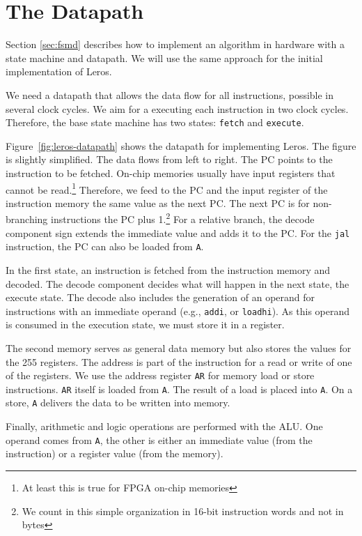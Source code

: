 \documentclass[%
    10pt,
    headinclude, footexclude,
    openright, %
    notitlepage,
    cleardoubleempty,
    headsepline,
    pointlessnumbers,
    bibtotoc, idxtotoc,
    ]{scrbook}
\newcommand{\code}[1]{{\lstinline[basicstyle=\small\ttfamily]{#1}}}
\begin{document}
\section{The Datapath}

Section \ref{sec:fsmd} describes how to implement an algorithm in hardware with
a state machine and datapath. We will use the same approach for the initial
implementation of Leros.

We need a datapath that allows the data flow for all instructions, possible in several
clock cycles. We aim for a executing each instruction in two clock cycles.
Therefore, the base state machine has two states: \code{fetch} and \code{execute}.

Figure~\ref{fig:leros-datapath} shows the datapath for implementing Leros.
The figure is slightly simplified.
The data flows from left to right. The PC points to the instruction to be fetched.
On-chip memories usually have input registers that cannot be read.\footnote{At least
this is true for FPGA on-chip memories} Therefore, we feed to the PC and the input register
of the instruction memory the same value as the next PC. The next PC is for non-branching
instructions the PC plus 1.\footnote{We count in this simple organization in 16-bit instruction
words and not in bytes} For a relative branch, the decode component sign extends the immediate
value and adds it to the PC. For the \code{jal} instruction, the PC can also be loaded from \code{A}.

In the first state, an instruction is fetched from the instruction memory and decoded.
The decode component decides what will happen in the next state, the execute state.
The decode also includes the generation of an operand for instructions with an immediate operand
(e.g., \code{addi}, or \code{loadhi}). As this operand is consumed in the execution state,
we must store it in a register.

The second memory serves as general data memory but also stores the values for the
255 registers. The address is part of the instruction for a read or write of one of the registers.
We use the address register \code{AR} for memory load or store instructions.
\code{AR} itself is loaded from \code{A}. The result of a load is placed into \code{A}.
On a store, \code{A} delivers the data to be written into memory.

Finally, arithmetic and logic operations are performed with the ALU. One operand
comes from \code{A}, the other is either an immediate value (from the instruction)
or a register value (from the memory).
\end{document}
